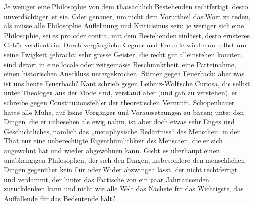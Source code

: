 Je weniger eine Philosophie von dem thatsächlich Bestehenden rechtfertigt, desto unverdächtiger ist sie. Oder genauer, um nicht dem Vorurtheil das Wort zu reden, als müsse alle Philosophie Auflehnung und Kriticismus sein: je weniger sich eine Philosophie, sei es pro oder contra, mit dem Bestehenden einlässt, desto ernsteres Gehör verdient sie. Durch vergängliche Gegner und Freunde wird man selbst um seine Ewigkeit gebracht: sehr grosse Geister, die recht gut alleinstehen konnten, sind derart in eine locale oder zeitgemässe Beschränktheit, eine Parteinahme, einen historischen Anschluss untergekrochen. Stirner gegen Feuerbach: aber was ist uns heute Feuerbach? Kant schrieb gegen Leibniz-Wolfische Curiosa, die selbst unter Theologen aus der Mode sind, verstand aber (und gab zu verstehen), er schreibe gegen Constitutionsfehler der theoretischen Vernunft. Schopenhauer hatte alle Mühe, auf keine Vorgänger und Voraussetzungen zu bauen; unter den Dingen, die er unbesehen als ewig nahm, ist aber doch etwas sehr Enges und Geschichtliches, nämlich das „metaphysische Bedürfniss“ des Menschen: in der That nur eine unberechtigte Eigenthümlichkeit des Menschen, die er sich angewöhnt hat und wieder abgewöhnen kann. Giebt es überhaupt einen unabhängigen Philosophen, der sich den Dingen, insbesondere den menschlichen Dingen gegenüber kein Für oder Wider abzwingen lässt, der nicht rechtfertigt und verdammt, der hinter das Factische von ein paar Jahrtausenden zurückdenken kann und nicht wie alle Welt das Nächste für das Wichtigste, das Auffallende für das Bedeutende hält?
\par

